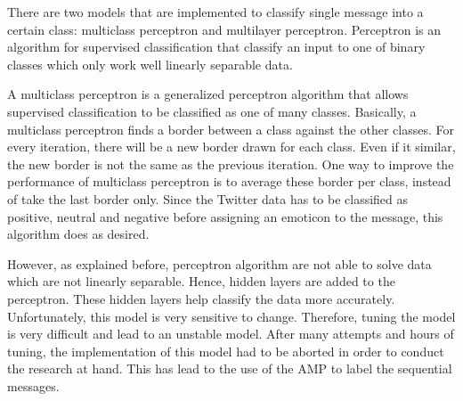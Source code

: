 There are two models that are implemented to classify single message into a certain class: multiclass perceptron and multilayer perceptron.
Perceptron is an algorithm for supervised classification that classify an input to one of binary classes which only work well linearly separable data.

A multiclass perceptron is a generalized perceptron algorithm that allows supervised classification to be classified as one of many classes.
Basically, a multiclass perceptron finds a border between a class against the other classes.
For every iteration, there will be a new border drawn for each class.
Even if it similar, the new border is not the same as the previous iteration.
One way to improve the performance of multiclass perceptron is to average these border per class, instead of take the last border only.
Since the Twitter data has to be classified as positive, neutral and negative before assigning an emoticon to the message, this algorithm does as desired.

However, as explained before, perceptron algorithm are not able to solve data which are not linearly separable.
Hence, hidden layers are added to the perceptron.
These hidden layers help classify the data more accurately.
Unfortunately, this model is very sensitive to change.
Therefore, tuning the model is very difficult and lead to an unstable model.
After many attempts and hours of tuning, the implementation of this model had to be aborted in order to conduct the research at hand.
This has lead to the use of the AMP to label the sequential messages.
